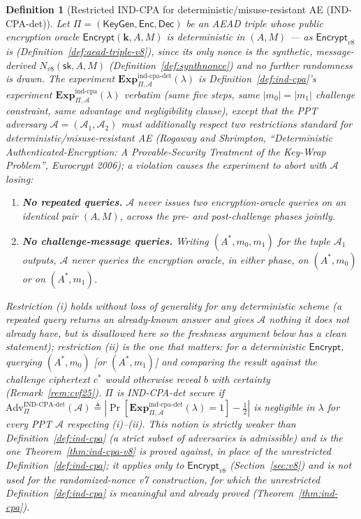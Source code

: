 \documentclass[11pt,a4paper]{article}
\newtheorem{definition}[theorem]{Definition}
\begin{document}
\begin{definition}[Restricted IND-CPA for deterministic/misuse-resistant AE (IND-CPA-det)]
\label{def:ind-cpa-det}
Let $\Pi=(\mathsf{KeyGen},\mathsf{Enc},\mathsf{Dec})$ be an AEAD triple
whose public encryption oracle $\mathsf{Encrypt}(\mathbf{k},A,M)$ is
\emph{deterministic} in $(A,M)$ --- as $\mathsf{Encrypt}_{v8}$ is
(Definition~\ref{def:aead-triple-v8}), since its only nonce is the
synthetic, message-derived $N_{v8}(\mathsf{sk},A,M)$
(Definition~\ref{def:synthnonce}) and no further randomness is drawn. The
experiment $\mathbf{Exp}^{\mathrm{ind\text{-}cpa\text{-}det}}_{\Pi,\mathcal{A}}(\lambda)$
is Definition~\ref{def:ind-cpa}'s experiment
$\mathbf{Exp}^{\mathrm{ind\text{-}cpa}}_{\Pi,\mathcal{A}}(\lambda)$
verbatim (same five steps, same $|m_0|=|m_1|$ challenge constraint, same
advantage and negligibility clause), \emph{except} that the PPT adversary
$\mathcal{A}=(\mathcal{A}_1,\mathcal{A}_2)$ must additionally respect two
restrictions standard for deterministic/misuse-resistant AE (Rogaway and
Shrimpton, ``Deterministic Authenticated-Encryption: A Provable-Security
Treatment of the Key-Wrap Problem'', Eurocrypt 2006); a violation causes
the experiment to abort with $\mathcal{A}$ losing:
\begin{enumerate}
  \item[(i)] \textbf{No repeated queries.} $\mathcal{A}$ never issues two
    encryption-oracle queries on an identical pair $(A,M)$, across the
    pre- and post-challenge phases jointly.
  \item[(ii)] \textbf{No challenge-message queries.} Writing
    $(A^*,m_0,m_1)$ for the tuple $\mathcal{A}_1$ outputs, $\mathcal{A}$
    never queries the encryption oracle, in either phase, on $(A^*,m_0)$
    or on $(A^*,m_1)$.
\end{enumerate}
Restriction (i) holds without loss of generality for any deterministic
scheme (a repeated query returns an already-known answer and gives
$\mathcal{A}$ nothing it does not already have, but is disallowed here so
the freshness argument below has a clean statement); restriction (ii) is
the one that matters: for a deterministic $\mathsf{Encrypt}$, querying
$(A^*,m_0)$ [or $(A^*,m_1)$] and comparing the result against the
challenge ciphertext $c^*$ would otherwise reveal $b$ with certainty
(Remark~\ref{rem:cvf25}). $\Pi$ is \emph{IND-CPA-det secure} if
$\mathrm{Adv}^{\mathrm{IND\text{-}CPA\text{-}det}}_{\Pi}(\mathcal{A})
\triangleq
|\Pr[\mathbf{Exp}^{\mathrm{ind\text{-}cpa\text{-}det}}_{\Pi,\mathcal{A}}(\lambda)=1]-\tfrac12|$
is negligible in $\lambda$ for every PPT $\mathcal{A}$ respecting
(i)--(ii). This notion is strictly weaker than Definition~\ref{def:ind-cpa}
(a strict subset of adversaries is admissible) and is the one
Theorem~\ref{thm:ind-cpa-v8} is proved against, in place of the
unrestricted Definition~\ref{def:ind-cpa}; it applies only to
$\mathsf{Encrypt}_{v8}$ (Section~\ref{sec:v8}) and is \emph{not} used for
the randomized-nonce v7 construction, for which the unrestricted
Definition~\ref{def:ind-cpa} is meaningful and already proved
(Theorem~\ref{thm:ind-cpa}).
\end{definition}
\end{document}
